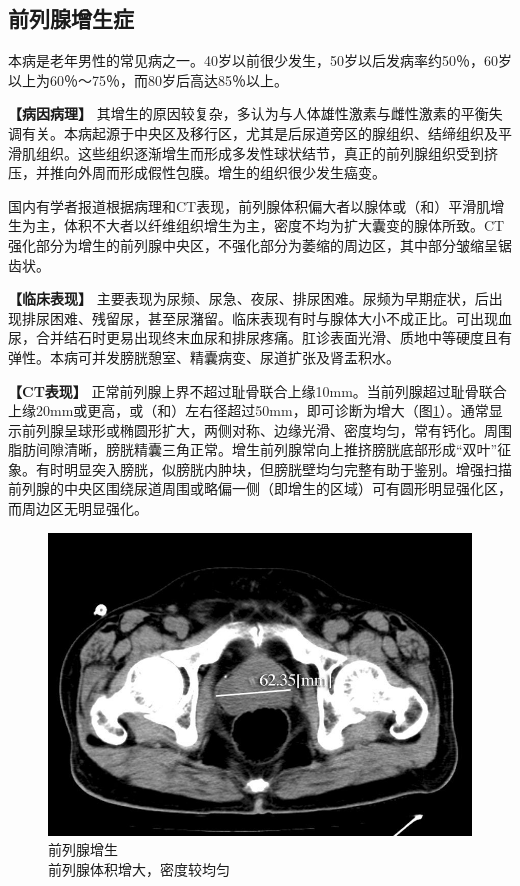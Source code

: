 \subsection{前列腺增生症}

本病是老年男性的常见病之一。40岁以前很少发生，50岁以后发病率约50％，60岁以上为60％～75％，而80岁后高达85％以上。

\textbf{【病因病理】}
其增生的原因较复杂，多认为与人体雄性激素与雌性激素的平衡失调有关。本病起源于中央区及移行区，尤其是后尿道旁区的腺组织、结缔组织及平滑肌组织。这些组织逐渐增生而形成多发性球状结节，真正的前列腺组织受到挤压，并推向外周而形成假性包膜。增生的组织很少发生癌变。

国内有学者报道根据病理和CT表现，前列腺体积偏大者以腺体或（和）平滑肌增生为主，体积不大者以纤维组织增生为主，密度不均为扩大囊变的腺体所致。CT强化部分为增生的前列腺中央区，不强化部分为萎缩的周边区，其中部分皱缩呈锯齿状。

\textbf{【临床表现】}
主要表现为尿频、尿急、夜尿、排尿困难。尿频为早期症状，后出现排尿困难、残留尿，甚至尿潴留。临床表现有时与腺体大小不成正比。可出现血尿，合并结石时更易出现终末血尿和排尿疼痛。肛诊表面光滑、质地中等硬度且有弹性。本病可并发膀胱憩室、精囊病变、尿道扩张及肾盂积水。

\textbf{【CT表现】}
正常前列腺上界不超过耻骨联合上缘10mm。当前列腺超过耻骨联合上缘20mm或更高，或（和）左右径超过50mm，即可诊断为增大（图\ref{fig21-3}）。通常显示前列腺呈球形或椭圆形扩大，两侧对称、边缘光滑、密度均匀，常有钙化。周围脂肪间隙清晰，膀胱精囊三角正常。增生前列腺常向上推挤膀胱底部形成“双叶”征象。有时明显突入膀胱，似膀胱内肿块，但膀胱壁均匀完整有助于鉴别。增强扫描前列腺的中央区围绕尿道周围或略偏一侧（即增生的区域）可有圆形明显强化区，而周边区无明显强化。

\begin{figure}[!htbp]
 \centering
 \includegraphics[width=.7\textwidth,height=\textheight,keepaspectratio]{./images/Image00399.jpg}
 \captionsetup{justification=centering}
 \caption{前列腺增生\\{\small 前列腺体积增大，密度较均匀}}
 \label{fig21-3}
  \end{figure} 

